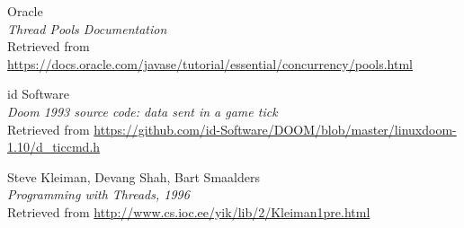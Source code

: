 \documentclass[11pt]{article}
\begin{document}
\begin{thebibliography}{9}
\hypertarget{threadpool}{}
\begin{flushleft}
	Oracle \\
	\textit{Thread Pools Documentation} \\
	Retrieved from \url{https://docs.oracle.com/javase/tutorial/essential/concurrency/pools.html}
\end{flushleft}

\hypertarget{doom_network}{}
\begin{flushleft}
	id Software \\
	\textit{Doom 1993 source code: data sent in a game tick} \\
	Retrieved from \url{https://github.com/id-Software/DOOM/blob/master/linuxdoom-1.10/d_ticcmd.h}
\end{flushleft}

\hypertarget{client_server}{}
\begin{flushleft}
	Steve Kleiman, Devang Shah, Bart Smaalders \\
	\textit{Programming with Threads, 1996} \\
	Retrieved from \url{http://www.cs.ioc.ee/yik/lib/2/Kleiman1pre.html}
\end{flushleft}

\end{thebibliography}
\end{document}
